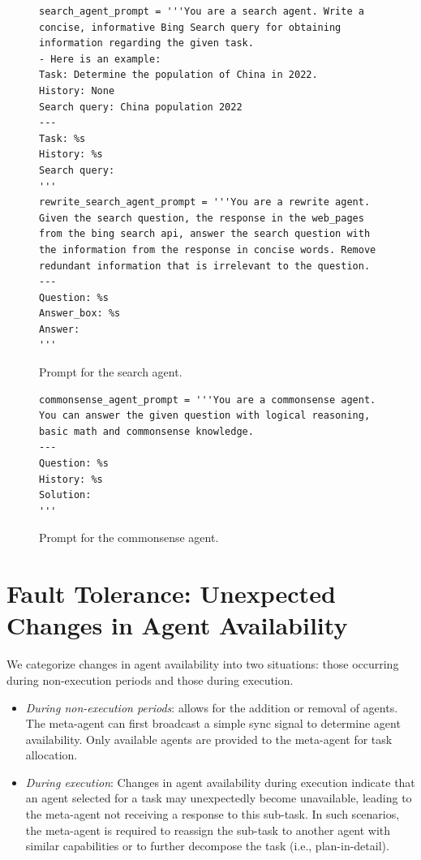 \begin{figure}[H]
\centering
\begin{lstlisting}[frame=single, basicstyle=\scriptsize\ttfamily, breaklines=true]
search_agent_prompt = '''You are a search agent. Write a concise, informative Bing Search query for obtaining information regarding the given task.
- Here is an example:
Task: Determine the population of China in 2022.
History: None
Search query: China population 2022
---
Task: %s
History: %s
Search query: 
'''
rewrite_search_agent_prompt = '''You are a rewrite agent. Given the search question, the response in the web_pages from the bing search api, answer the search question with the information from the response in concise words. Remove redundant information that is irrelevant to the question.
---
Question: %s
Answer_box: %s
Answer:
'''
\end{lstlisting}
\caption{Prompt for the search agent.}
\label{search}
\end{figure}

\begin{figure}[H]
\centering
\begin{lstlisting}[frame=single, basicstyle=\scriptsize\ttfamily, breaklines=true]
commonsense_agent_prompt = '''You are a commonsense agent. You can answer the given question with logical reasoning, basic math and commonsense knowledge.
---
Question: %s
History: %s
Solution: 
'''
\end{lstlisting}
\caption{Prompt for the commonsense agent.}
\label{commonsense}
\end{figure}


\section{Fault Tolerance: Unexpected Changes in Agent Availability}
\label{app: fault_tolerance_agent_availability}

We categorize changes in agent availability into two situations: those occurring during non-execution periods and those during execution.
\begin{itemize}
    \item \textit{During non-execution periods}: \name allows for the addition or removal of agents. The meta-agent can first broadcast a simple sync signal to determine agent availability. Only available agents are provided to the meta-agent for task allocation. 
    \item \textit{During execution}: Changes in agent availability during execution indicate that an agent selected for a task may unexpectedly become unavailable, leading to the meta-agent not receiving a response to this sub-task. In such scenarios, the meta-agent is required to reassign the sub-task to another agent with similar capabilities or to further decompose the task (i.e., plan-in-detail).
\end{itemize}
